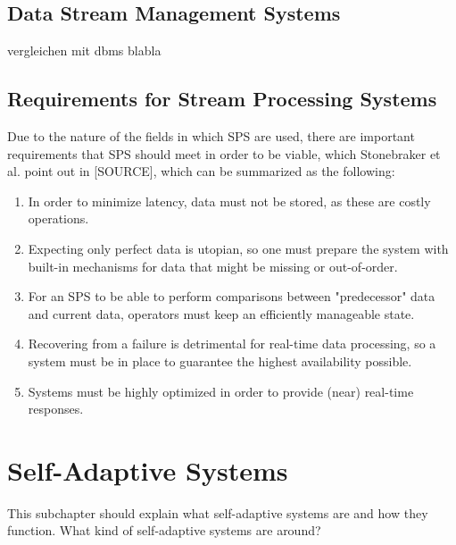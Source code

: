         \subsection{Data Stream Management Systems}
        vergleichen mit dbms blabla


        \subsection{Requirements for Stream Processing Systems}
        Due to the nature of the fields in which SPS are used, there are important requirements that SPS should meet in order to be viable, 
        which Stonebraker et al. point out in [SOURCE], which can be summarized as the following:
        
        \begin{enumerate}
            \item {} 
                In order to minimize latency, data must not be stored, as these are costly operations.
            \item {} 
                Expecting only perfect data is utopian, so one must prepare the system with built-in mechanisms for data that might be missing or out-of-order.
            \item {} 
                For an SPS to be able to perform comparisons between "predecessor" data and current data, operators must keep an efficiently manageable state.
            \item {} 
                Recovering from a failure is detrimental for real-time data processing, so a system must be in place to guarantee the highest availability possible.
            \item {} 
                Systems must be highly optimized in order to provide (near) real-time responses.
        \end{enumerate}

    \section{Self-Adaptive Systems}
    This subchapter should explain what self-adaptive systems are and how they function.
    What kind of self-adaptive systems are around?

